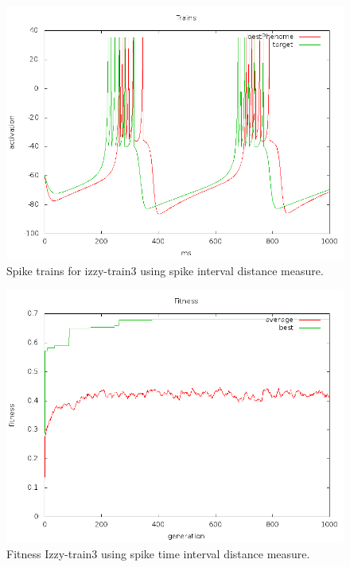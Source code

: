 \documentclass[a4paper]{article}
\begin{document}
\begin{figure}[htb!]
  \centering
  \includegraphics[width=\textwidth]{SpikeInterval-izzy3-trains-plot.png}
  \caption{Spike trains for izzy-train3 using spike interval distance measure.}
\end{figure}

\newpage

\begin{figure}[htb!]
  \centering
  \includegraphics[width=\textwidth]{Waveform-izzy3-fitness-plot.png}
  \caption{Fitness Izzy-train3 using spike time interval distance measure.}
\end{figure}
\end{document}
